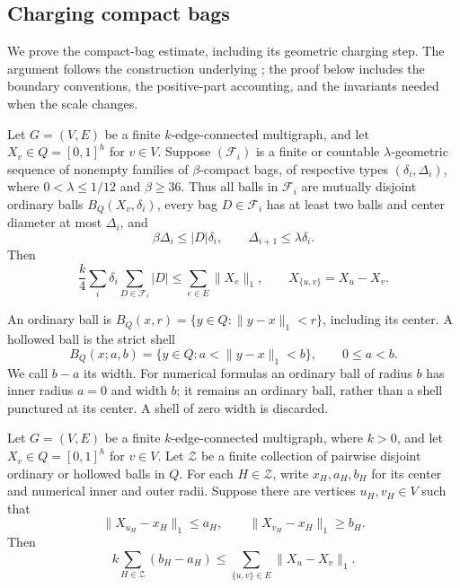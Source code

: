 \subsection{Charging compact bags}
\label{hc:section}

We prove the compact-bag estimate, including its geometric charging
step.  The argument follows the construction underlying
\cite[Proposition~7.1 and Section~7.1]{AOG}; the proof below includes the
boundary conventions, the positive-part accounting, and the invariants
needed when the scale changes.

\begin{proposition}
\label{prop:hierarchy-compact}
Let \(G=(V,E)\) be a finite \(k\)-edge-connected multigraph, and let
\(X_v\in Q=[0,1]^h\) for \(v\in V\).
Suppose \((\mathcal F_i)\) is a finite or countable
\(\lambda\)-geometric sequence of nonempty families of
\(\beta\)-compact bags, of respective types \((\delta_i,\Delta_i)\), where
\(0<\lambda\le 1/12\) and \(\beta\ge36\).  Thus all balls in
\(\mathcal F_i\) are mutually disjoint ordinary balls
\(B_Q(X_v,\delta_i)\), every bag \(D\in\mathcal F_i\) has at least two
balls and center diameter at most \(\Delta_i\), and
\[
 \beta\Delta_i\le |D|\delta_i,
 \qquad
 \Delta_{i+1}\le\lambda\delta_i.
\]
Then
\begin{equation}
\label{hc:conclusion}
 \frac{k}{4}\sum_i\delta_i\sum_{D\in\mathcal F_i}|D|
 \le \sum_{e\in E}\|X_e\|_1,
 \qquad X_{\{u,v\}}=X_u-X_v.
\end{equation}
\end{proposition}

An ordinary ball is \(B_Q(x,r)=\{y\in Q:\|y-x\|_1<r\}\), including
its center.  A hollowed ball is the strict shell
\[
 B_Q(x;a,b)=\{y\in Q:a<\|y-x\|_1<b\},
 \qquad 0\le a<b.
\]
We call \(b-a\) its width.  For numerical formulas an ordinary ball of
radius \(b\) has inner radius \(a=0\) and width \(b\); it remains an
ordinary ball, rather than a shell punctured at its center.  A shell of
zero width is discarded.

\begin{lemma}
\label{hc:length}
Let \(G=(V,E)\) be a finite \(k\)-edge-connected multigraph, where
\(k>0\), and let \(X_v\in Q=[0,1]^h\) for \(v\in V\).
Let \(\mathcal Z\) be a finite collection of pairwise disjoint ordinary
or hollowed balls in \(Q\).  For each \(H\in\mathcal Z\), write
\(x_H,a_H,b_H\) for its center and numerical inner and outer radii.
Suppose there are vertices \(u_H,v_H\in V\) such that
\begin{equation}
\label{hc:witness}
 \|X_{u_H}-x_H\|_1\le a_H,
 \qquad \|X_{v_H}-x_H\|_1\ge b_H.
\end{equation}
Then
\begin{equation}
\label{hc:length-bound}
 k\sum_{H\in\mathcal Z}(b_H-a_H)
 \le \sum_{\{u,v\}\in E}\|X_u-X_v\|_1.
\end{equation}
\end{lemma}

